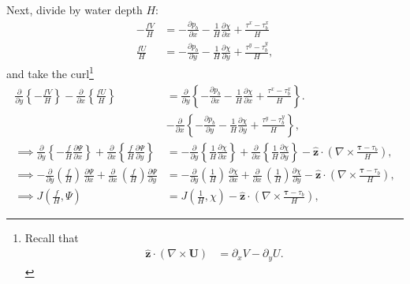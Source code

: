 \documentclass[10pt]{amsart}
\begin{document}
Next, divide by water depth $H$:
 \begin{align}
- \frac{f V}{H} & =  - \frac{\partial p_b}{\partial x} - \frac{1}{H} \frac{\partial \chi}{\partial x} + \frac{\tau^x - \tau^x_b}{H}   \\
\frac{f  U}{H} & = - \frac{\partial p_b}{\partial y} - \frac{1}{H} \frac{\partial \chi }{\partial y} + \frac{\tau^y - \tau^y_b}{H} ,
\end{align}
and take the curl\footnote{
Recall that 
\begin{align}
{\hat{\mathbf z}} \cdot \left( \nabla \times {\mathbf U} \right) & = \partial_x V - \partial_y U .
\end{align}
}
 \begin{align}
\frac{\partial}{\partial y} \left\{- \frac{f V}{H} \right\}  - \frac{\partial}{\partial x} \left\{\frac{f  U}{H} \right\} & = 
\frac{\partial}{\partial y} \left\{ - \frac{\partial p_b}{\partial x} - \frac{1}{H} \frac{\partial \chi}{\partial x}  + \frac{\tau^x - \tau^x_b}{H} \right\} \nonumber. \\
& -  \frac{\partial}{\partial x} \left\{ - \frac{\partial p_b}{\partial y} - \frac{1}{H} \frac{\partial \chi }{\partial y}  + \frac{\tau^y - \tau^y_b}{H} \right\}, \\
\implies
\frac{\partial}{\partial y} \left\{- \frac{f }{H} \frac{\partial \Psi}{\partial x} \right\}  + \frac{\partial}{\partial x} \left\{\frac{f }{H} \frac{\partial \Psi}{\partial y} \right\} & = 
- \frac{\partial}{\partial y} \left\{ \frac{1}{H} \frac{\partial \chi}{\partial x} \right\} + \frac{\partial}{\partial x} \left\{ \frac{1}{H} \frac{\partial \chi }{\partial y}  \right\}  - {\hat{\mathbf z}} \cdot \left( \nabla \times \frac{{\mathbf \tau - \tau_b}}{H} \right), \nonumber \\
\implies
- \frac{\partial}{\partial y} \left(\frac{f }{H} \right) \, \frac{\partial \Psi}{\partial x}  + \frac{\partial}{\partial x} \, \left( \frac{f }{H}  \right) \frac{\partial \Psi}{\partial y} & = 
- \frac{\partial}{\partial y} \left( \frac{1}{H} \right) \, \frac{\partial \chi}{\partial x} + \frac{\partial}{\partial x} \, \left( \frac{1}{H} \right) \frac{\partial \chi }{\partial y}   - {\hat{\mathbf z}} \cdot \left( \nabla \times \frac{{\mathbf \tau - \tau_b}}{H} \right), \label{eqn:GCVB0} \\
\implies
J\left( \frac{f}{H} , \Psi \right)  & =  J \left( \frac{1}{H}, \chi \right)
- {\hat{\mathbf z}} \cdot \left( \nabla \times \frac{{\mathbf \tau - \tau_b}}{H} \right) ,
\label{eqn:GCVB}
\end{align}
\end{document}
